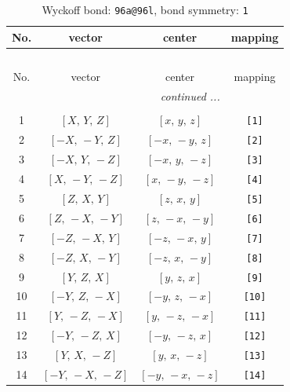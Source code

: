 \documentclass[fleqn,8pt]{jsarticle}
\begin{document}
\begin{longtable}{cccc}
\caption{Wyckoff bond: {\tt 96a@96l}, bond symmetry: {\tt 1}}
 \\
 \hline \hline
No. & vector & center & mapping \\ \hline \endfirsthead

\multicolumn{3}{l}{\tablename\ \thetable{}} \\
 \hline \hline
No. & vector & center & mapping \\ \hline \endhead

 \hline \hline
\multicolumn{3}{r}{\footnotesize\it continued ...} \\ \endfoot

 \hline \hline
\multicolumn{3}{r}{} \\ \endlastfoot

1 & $\left[ X,\, Y,\, Z \right]$ & $\left[ x,\, y,\, z \right]$ & {\tt [1]} \\ \hline
2 & $\left[ - X,\, - Y,\, Z \right]$ & $\left[ - x,\, - y,\, z \right]$ & {\tt [2]} \\ \hline
3 & $\left[ - X,\, Y,\, - Z \right]$ & $\left[ - x,\, y,\, - z \right]$ & {\tt [3]} \\ \hline
4 & $\left[ X,\, - Y,\, - Z \right]$ & $\left[ x,\, - y,\, - z \right]$ & {\tt [4]} \\ \hline
5 & $\left[ Z,\, X,\, Y \right]$ & $\left[ z,\, x,\, y \right]$ & {\tt [5]} \\ \hline
6 & $\left[ Z,\, - X,\, - Y \right]$ & $\left[ z,\, - x,\, - y \right]$ & {\tt [6]} \\ \hline
7 & $\left[ - Z,\, - X,\, Y \right]$ & $\left[ - z,\, - x,\, y \right]$ & {\tt [7]} \\ \hline
8 & $\left[ - Z,\, X,\, - Y \right]$ & $\left[ - z,\, x,\, - y \right]$ & {\tt [8]} \\ \hline
9 & $\left[ Y,\, Z,\, X \right]$ & $\left[ y,\, z,\, x \right]$ & {\tt [9]} \\ \hline
10 & $\left[ - Y,\, Z,\, - X \right]$ & $\left[ - y,\, z,\, - x \right]$ & {\tt [10]} \\ \hline
11 & $\left[ Y,\, - Z,\, - X \right]$ & $\left[ y,\, - z,\, - x \right]$ & {\tt [11]} \\ \hline
12 & $\left[ - Y,\, - Z,\, X \right]$ & $\left[ - y,\, - z,\, x \right]$ & {\tt [12]} \\ \hline
13 & $\left[ Y,\, X,\, - Z \right]$ & $\left[ y,\, x,\, - z \right]$ & {\tt [13]} \\ \hline
14 & $\left[ - Y,\, - X,\, - Z \right]$ & $\left[ - y,\, - x,\, - z \right]$ & {\tt [14]} \\ \hline

\end{longtable}
\end{document}
